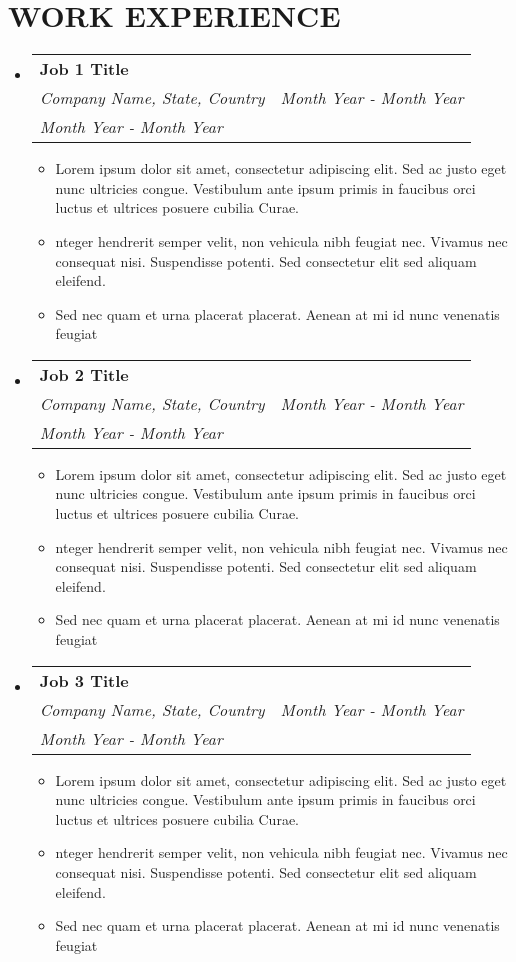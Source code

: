 \documentclass[letterpaper,11pt]{article}
\makeatletter
\newcommand{\resumeItem}[1]{
  \item\small{
    {#1 \vspace{-1pt}}
  }
}
\newcommand{\resumeSubheading}[4]{
  \vspace{-2pt}\item
    \begin{tabular*}{1.0\textwidth}[t]{l@{\extracolsep{\fill}}r}
      \textbf{\large#1} & \textbf{\small #2} \\
      \textit{\large#3} & \textit{\small #4} \\
      \textit{\large#4}

    \end{tabular*}\vspace{-7pt}
}
\newcommand{\resumeSubHeadingListStart}{\begin{itemize}[leftmargin=0.0in, label={}]}
\newcommand{\resumeSubHeadingListEnd}{\end{itemize}}
\newcommand{\resumeItemListStart}{\begin{itemize}[leftmargin=0.1in]}
\newcommand{\resumeItemListEnd}{\end{itemize}\vspace{-5pt}}
\makeatother
\begin{document}
\section{\color{airforceblue}WORK EXPERIENCE}
  \resumeSubHeadingListStart

    \resumeSubheading
      {Job 1 Title}{}
      {Company Name, State, Country}{Month Year - Month Year}
      \resumeItemListStart
            \resumeItem{\normalsize{Lorem ipsum dolor sit amet, consectetur adipiscing elit. Sed ac justo eget nunc ultricies congue. Vestibulum ante ipsum primis in faucibus orci luctus et ultrices posuere cubilia Curae.}}
            \resumeItem{\normalsize{nteger hendrerit semper velit, non vehicula nibh feugiat nec. Vivamus nec consequat nisi. Suspendisse potenti. Sed consectetur elit sed aliquam eleifend.}}
            \resumeItem{\normalsize{Sed nec quam et urna placerat placerat. Aenean at mi id nunc venenatis feugiat}}
      \resumeItemListEnd

    \resumeSubheading
      {Job 2 Title}{}
      {Company Name, State, Country}{Month Year - Month Year}
      \resumeItemListStart
            \resumeItem{\normalsize{Lorem ipsum dolor sit amet, consectetur adipiscing elit. Sed ac justo eget nunc ultricies congue. Vestibulum ante ipsum primis in faucibus orci luctus et ultrices posuere cubilia Curae.}}
            \resumeItem{\normalsize{nteger hendrerit semper velit, non vehicula nibh feugiat nec. Vivamus nec consequat nisi. Suspendisse potenti. Sed consectetur elit sed aliquam eleifend.}}
            \resumeItem{\normalsize{Sed nec quam et urna placerat placerat. Aenean at mi id nunc venenatis feugiat}}
      \resumeItemListEnd

    \resumeSubheading
      {Job 3 Title}{}
      {Company Name, State, Country}{Month Year - Month Year}
      \resumeItemListStart
            \resumeItem{\normalsize{Lorem ipsum dolor sit amet, consectetur adipiscing elit. Sed ac justo eget nunc ultricies congue. Vestibulum ante ipsum primis in faucibus orci luctus et ultrices posuere cubilia Curae.}}
            \resumeItem{\normalsize{nteger hendrerit semper velit, non vehicula nibh feugiat nec. Vivamus nec consequat nisi. Suspendisse potenti. Sed consectetur elit sed aliquam eleifend.}}
            \resumeItem{\normalsize{Sed nec quam et urna placerat placerat. Aenean at mi id nunc venenatis feugiat}}
      \resumeItemListEnd

  \resumeSubHeadingListEnd
\vspace{-12pt}
\end{document}

